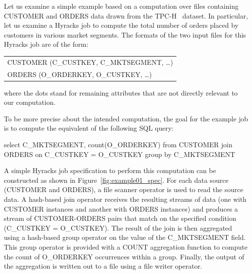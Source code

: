 Let us examine a simple example based on a computation over files containing CUSTOMER and ORDERS data drawn from the TPC-H~\cite{tpch:website} dataset.
In particular, let us examine a Hyracks job to compute the total number of orders placed by customers in various market segments. 
The formats of the two input files for this Hyracks job are of the form:
\vspace{-1mm}
\begin{center}
{\small
\begin{tabular}{l}
CUSTOMER (C\_CUSTKEY, C\_MKTSEGMENT, \dots)\\
ORDERS (O\_ORDERKEY, O\_CUSTKEY, \dots)\\
\end{tabular}
}
\end{center}
\vspace{-1mm} where the dots stand for remaining attributes that are not directly relevant to our computation.


To be more precise about the intended computation, the goal for the example job is to compute the equivalent of the following SQL query:
\begin{sql}
select C_MKTSEGMENT, count(O_ORDERKEY)
from CUSTOMER join ORDERS on C_CUSTKEY = O_CUSTKEY
group by C_MKTSEGMENT
\end{sql}

A simple Hyracks job specification to perform this computation can be constructed as shown in Figure~\ref{fig:example01_spec}.
For each data source (CUSTOMER and ORDERS), a file scanner operator is used to read the source data.
A hash-based join operator receives the resulting streams of data (one with CUSTOMER instances and another with ORDERS
instances) and produces a stream of CUSTOMER-ORDERS pairs that match on the specified condition (C\_CUSTKEY = O\_CUSTKEY).
The result of the join is then aggregated using a hash-based group operator on the value of the C\_MKTSEGMENT field.
This group operator is provided with a COUNT aggregation function to compute the count of O\_ORDERKEY occurrences within a group.
Finally, the output of the aggregation is written out to a file using a file writer operator.

